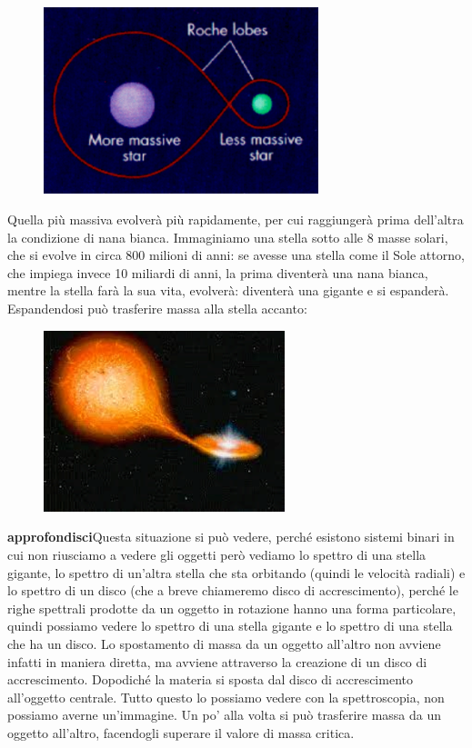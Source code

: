 \begin{figure}[H]
    \centering
    \includegraphics[width=8cm]{lezione 28 novembre/sistemabinario1.png}
\end{figure}

Quella più massiva evolverà più rapidamente, per cui raggiungerà prima dell'altra la condizione di nana bianca. Immaginiamo una stella sotto alle 8 masse solari, che si evolve in circa 800 milioni di anni: se avesse una stella come il Sole attorno, che impiega invece 10 miliardi di anni, la prima diventerà una nana bianca, mentre la stella farà la sua vita, evolverà: diventerà una gigante e si espanderà. Espandendosi può trasferire massa alla stella accanto:

\begin{figure}[H]
    \centering
    \includegraphics[width=7cm]{lezione 28 novembre/discoaccrescimento.png}
\end{figure}

\textbf{approfondisci}Questa situazione si può vedere, perché esistono sistemi binari in cui non riusciamo a vedere gli oggetti però vediamo lo spettro di una stella gigante, lo spettro di un'altra stella che sta orbitando (quindi le velocità radiali) e lo spettro di un disco (che a breve chiameremo disco di accrescimento), perché le righe spettrali prodotte da un oggetto in rotazione hanno una forma particolare, quindi possiamo vedere lo spettro di una stella gigante e lo spettro di una stella che ha un disco. Lo spostamento di massa da un oggetto all'altro non avviene infatti in maniera diretta, ma avviene attraverso la creazione di un disco di accrescimento. Dopodiché la materia si sposta dal disco di accrescimento all'oggetto centrale. Tutto questo lo possiamo vedere con la spettroscopia, non possiamo averne un'immagine. Un po' alla volta si può trasferire massa da un oggetto all'altro, facendogli superare il valore di massa critica.

